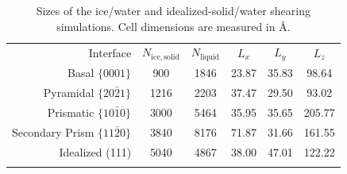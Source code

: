 \documentclass[aps,jcp,preprint,showpacs,superscriptaddress,groupedaddress]{revtex4}  %
\begin{document}

\newpage
\begin{table}[h]
\centering
\caption{Sizes of the ice/water and idealized-solid/water shearing simulations.  Cell
  dimensions are measured in \AA. \label{tab:method}}
\begin{tabular}{r|ccccc}
\toprule
 Interface & $N_\mathrm{ice,solid}$ &
 $N_\mathrm{liquid}$ & $L_x$ & $L_y$ & $L_z$  \\
\colrule
Basal  $\{0001\}$                 & 900 & 1846  & 23.87 & 35.83 & 98.64  \\
Pyramidal  $\{20\bar{2}1\}$       & 1216 & 2203 & 37.47 & 29.50 & 93.02  \\
Prismatic  $\{10\bar{1}0\}$       & 3000 & 5464 & 35.95 & 35.65 & 205.77 \\
Secondary Prism  $\{11\bar{2}0\}$ & 3840 & 8176 & 71.87 & 31.66 & 161.55 \\
Idealized (111)                   & 5040 & 4867 & 38.00 & 47.01 & 122.22 \\
\botrule
\end{tabular}
\end{table}
\end{document}
